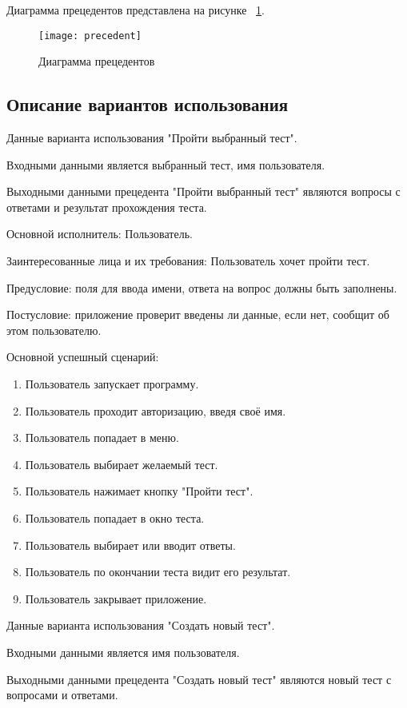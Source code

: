 Диаграмма прецедентов представлена на рисунке ~\ref{precedent:image}.

\begin{figure}[ht]
	\texttt{[image: precedent]}
	\caption{Диаграмма прецедентов}
	\label{precedent:image}
\end{figure}

\subsection{Описание вариантов использования}

Данные варианта использования "Пройти выбранный тест".

Входными данными является выбранный тест, имя пользователя.

Выходными данными прецедента "Пройти выбранный тест" являются вопросы с ответами и результат прохождения теста.

Основной исполнитель: Пользователь.

Заинтересованные лица и их требования: Пользователь хочет пройти тест.

Предусловие: поля для ввода имени, ответа на вопрос должны быть заполнены.

Постусловие: приложение проверит введены ли данные, если нет, сообщит об этом пользователю.

Основной успешный сценарий:
\begin{enumerate}
	\item Пользователь запускает программу.
	\item Пользователь проходит авторизацию, введя своё имя.
	\item Пользователь попадает в меню.
	\item Пользователь выбирает желаемый тест.
	\item Пользователь нажимает кнопку "Пройти тест".
	\item Пользователь попадает в окно теста.
	\item Пользователь выбирает или вводит ответы.
	\item Пользователь по окончании теста видит его результат.
	\item Пользователь закрывает приложение.
\end{enumerate}

Данные варианта использования "Создать новый тест".

Входными данными является имя пользователя.

Выходными данными прецедента "Создать новый тест" являются новый тест с вопросами и ответами.

